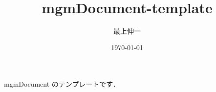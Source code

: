 \documentclass[dvipdfmx]{jsarticle}
\title{mgmDocument-template}
\author{最上伸一}
\date{\today}
\begin{document}
\maketitle

mgmDocument のテンプレートです．
\end{document}
